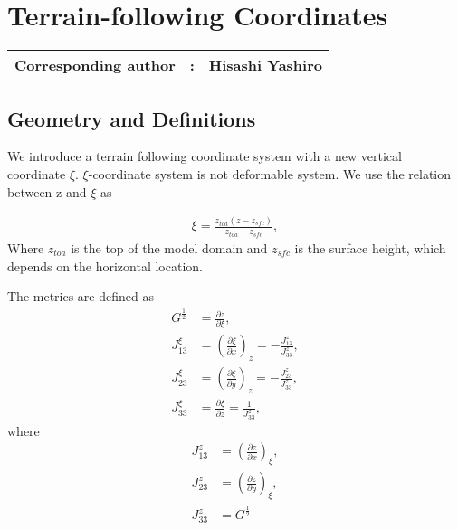 \chapter{Terrain-following Coordinates}
\label{chap:terrain-following}
{\bf \Large 
\begin{tabular}{ccc}
\hline
  Corresponding author & : & Hisashi Yashiro\\
\hline
\end{tabular}
}

\section{Geometry and Definitions}
We introduce a terrain following coordinate system with a new vertical coordinate $\xi$. 
$\xi$-coordinate system is not deformable system. We use the relation between z and $\xi$ as

\begin{eqnarray}
 \xi = \frac{z_{toa}(z-z_{sfc})}{z_{toa}-z_{sfc}},
\end{eqnarray}
Where $z_{toa}$ is the top of the model domain and $z_{sfc}$ is the surface height, 
which depends on the horizontal location.

The metrics are defined as
\begin{align}
 G^{\frac{1}{2}} &= \frac{\partial z}{\partial \xi}, \\
 J^{\xi}_{13} &= \left(\frac{\partial \xi}{\partial x}\right)_{z} = -\frac{J^{z}_{13}}{J^{z}_{33}},\\
 J^{\xi}_{23} &= \left(\frac{\partial \xi}{\partial y}\right)_{z} = -\frac{J^{z}_{23}}{J^{z}_{33}},\\
 J^{\xi}_{33} &=       \frac{\partial \xi}{\partial z}            =  \frac{1}         {J^{z}_{33}},
\end{align}
where
\begin{align}
 J^{z}_{13} &= \left(\frac{\partial z}{\partial x}\right)_{\xi},\\
 J^{z}_{23} &= \left(\frac{\partial z}{\partial y}\right)_{\xi},\\
 J^{z}_{33} &= G^{\frac{1}{2}}
\end{align}

